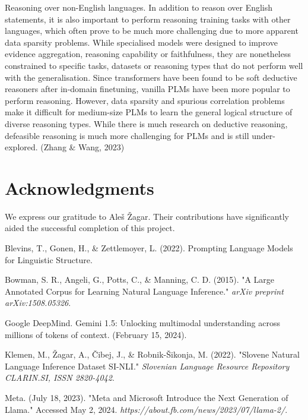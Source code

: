 \documentclass[fleqn,moreauthors,10pt]{ds_report}
\begin{document}
Reasoning over non-English languages. In addition to reason over English statements, it is also important to perform reasoning training tasks with other languages, which often prove to be much more challenging due to more apparent data sparsity problems. While specialised models were designed to improve evidence aggregation, reasoning capability or faithfulness, they are nonetheless constrained to specific tasks, datasets or reasoning types that do not perform well with  the generalisation. Since transformers have been found to be soft deductive reasoners after in-domain finetuning, vanilla PLMs have been more popular to perform reasoning. However, data sparsity and spurious correlation problems make it difficult for medium-size PLMs to learn the general logical structure of diverse reasoning types. While there is much research on deductive reasoning, defeasible reasoning is much more challenging for PLMs and is still under-explored. (Zhang \& Wang, 2023)


\section*{Acknowledgments}

We express our gratitude to Aleš Žagar. Their contributions have significantly aided the successful completion of this project.




Blevins, T., Gonen, H., \& Zettlemoyer, L. (2022). Prompting Language Models for Linguistic Structure.

Bowman, S. R., Angeli, G., Potts, C., \& Manning, C. D. (2015). "A Large Annotated Corpus for Learning Natural Language Inference." \textit{arXiv preprint arXiv:1508.05326}.

Google DeepMind. Gemini 1.5: Unlocking multimodal understanding across millions of tokens of context. (February 15, 2024).

Klemen, M., Žagar, A., Čibej, J., \& Robnik-Šikonja, M. (2022). "Slovene Natural Language Inference Dataset SI-NLI." \textit{Slovenian Language Resource Repository CLARIN.SI, ISSN 2820-4042}.

Meta. (July 18, 2023). "Meta and Microsoft Introduce the Next Generation of Llama." Accessed May 2, 2024. \allowbreak \textit{https://about.fb.com/news/2023/07/llama-2/}.
\end{document}
